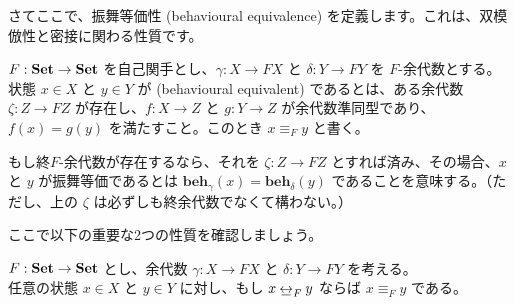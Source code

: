 \documentclass[
		head_space=20mm,
		foot_space=20mm,
		gutter=10mm,
		line_length=190mm
]{jlreq}
\begin{document}
\noindent さてここで、振舞等価性 (behavioural equivalence) を定義します。これは、双模倣性と密接に関わる性質です。

\begin{definition}[振舞等価性]
	$F:\mathbf{Set}\to\mathbf{Set}$ を自己関手とし、$\gamma:X\to FX$ と $\delta:Y\to FY$ を $F$-余代数とする。状態 $x\in X$ と $y\in Y$ が
	 (behavioural equivalent) であるとは、ある余代数 $\zeta:Z\to FZ$ が存在し、$f:X\to Z$ と $g:Y\to Z$ が余代数準同型であり、$f(x)=g(y)$ を満たすこと。このとき $x\equiv_F y$ と書く。\vspace{3pt}
	\begin{center}
	\end{center}
\end{definition}

\begin{supplement}
	もし終$F$-余代数が存在するなら、それを $\zeta:Z\to FZ$ とすれば済み、その場合、$x$ と $y$ が振舞等価であるとは $\mathbf{beh}_\gamma(x)=\mathbf{beh}_\delta(y)$ であることを意味する。（ただし、上の $\zeta$ は必ずしも終余代数でなくて構わない。）
\end{supplement}

\clearpage

\noindent ここで以下の重要な2つの性質を確認しましょう。\vspace{3pt}\\

\begin{proposition}
	$F:\mathbf{Set}\to\mathbf{Set}$ とし、余代数 $\gamma:X\to FX$ と $\delta:Y\to FY$ を考える。\\任意の状態 $x\in X$ と $y\in Y$ に対し、もし $x\mathbin{\,\underline{\!\leftrightarrow\!}\,}_F y$ ならば $x\equiv_F y$ である。
\end{proposition}
\end{document}
